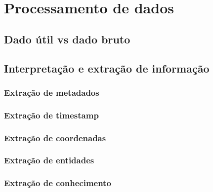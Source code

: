 \chapter{Processamento de dados}

\section{Dado útil vs dado bruto}
\section{Interpretação e extração de informação}
\subsection{Extração de metadados}
\subsection{Extração de timestamp}
\subsection{Extração de coordenadas}
\subsection{Extração de entidades}
\subsection{Extração de conhecimento}